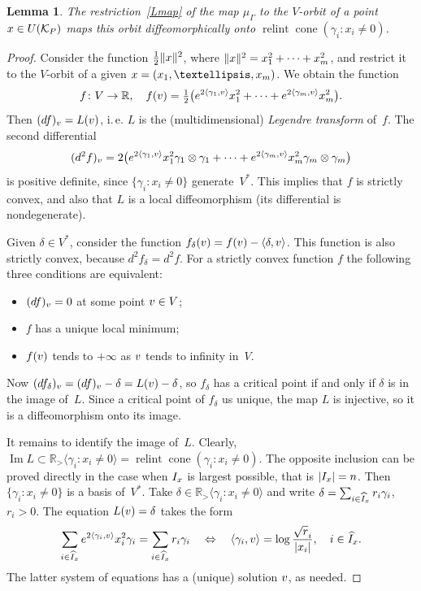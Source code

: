 \documentclass[a4paper]{amsart}
\newtheorem{lemma}[theorem]{Lemma}
\theoremstyle{definition}
\theoremstyle{remark}
\numberwithin{equation}{section}
\def\R{\mathbb R}
\def\R{\mathbb R}
\def\sK{\mathcal K}
\newcommand{\mb}[1]{{\textbf {\textit#1}}}
\def\Im{\mathop{\mathrm{Im}}}
\def\cone{\mathop{\mathrm{cone}}}
\def\relint{\mathop{\mathrm{relint}}}
\newcommand{\<}{\langle}
\renewcommand{\>}{\rangle}
\begin{document}
\begin{lemma}
\label{image}
The restriction~\eqref{Lmap} of the map $\mu_\Gamma$ to the $V$-orbit of a point $\mb x\in U(\sK_P)$ maps this orbit diffeomorphically onto $\relint\cone(\gamma_i\colon x_i\ne0)$.
\end{lemma}
\begin{proof}
Consider the function $\frac12\|\mb x\|^2$, where 
$\|\mb x\|^2=x_1^2+\cdots+x_m^2$, and restrict it to the $V$-orbit of a given $\mb x=(x_1,\ldots,x_m)$. We obtain the function
\begin{equation}\label{fsum}
  f\colon V\to\R,\quad f(\mb v)={\textstyle\frac12}\bigl(e^{2\langle\gamma_1,\mb 
  v\rangle}x_1^2+\cdots +e^{2\langle\gamma_m,\mb v\rangle}x_m^2\bigr).
\end{equation}
Then $(df)_{\mb v}=L(\mb v)$, i.\,e. $L$ is the (multidimensional) \emph{Legendre transform} of~$f$. The second differential
\[
  (d^2f)_{\mb v}=2\bigl(e^{2\langle\gamma_1,\mb v\rangle}x_1^2
  \gamma_1\otimes\gamma_1+
  \cdots +e^{2\langle\gamma_m,\mb v\rangle}   
  x_m^2\gamma_m\otimes\gamma_m\bigr)
\]
is positive definite, since $\{\gamma_i\colon x_i\ne0\}$ generate~$V^*$. This implies that $f$ is strictly convex, and also that $L$ is a local diffeomorphism (its differential is nondegenerate).

Given $\delta\in V^*$, consider the function $f_\delta(\mb v)=f(\mb v)-\langle\delta,\mb v\rangle$. This function is also strictly convex, because $d^2f_\delta=d^2f$. For a strictly convex function $f$ the following three conditions are equivalent:
\begin{itemize}
\item[(a)] $(df)_{\mb v}=0$ at some point $\mb v\in V$;
\item[(b)] $f$ has a unique local minimum;
\item[(c)] $f(\mb v)$ tends to $+\infty$ as $\mb v$ tends to infinity in~$V$.
\end{itemize}
Now $(df_\delta)_{\mb v}=(df)_{\mb v}-\delta=L(\mb v)-\delta$, so $f_\delta$ has a critical point if and only if $\delta$ is in the image of~$L$. Since a critical point of $f_\delta$ us unique, the map $L$ is injective, so it is a diffeomorphism onto its image. 

It remains to identify the image of~$L$. Clearly, $\Im L\subset\R_>\langle\gamma_i\colon x_i\ne 0\rangle=\relint\cone(\gamma_i\colon x_i\ne0)$. The opposite inclusion can be proved directly in the case when $I_{\mb x}$ is largest possible, that is $|I_{\mb x}|=n$. Then $\{\gamma_i\colon x_i\ne 0\}$ is a basis of~$V^*$. Take $\delta\in\R_>\langle\gamma_i\colon x_i\ne 0\rangle$ and write 
$\delta=\sum_{i\in\widehat I_{\mb x}}r_i\gamma_i$, $r_i>0$. The equation $L(\mb v)=\delta$ takes the form
\[
  \sum_{i\in\widehat I_{\mb x}}e^{2\langle\gamma_i,\mb v\rangle} x_i^2\gamma_i
  =\sum_{i\in\widehat I_{\mb x}}r_i\gamma_i\quad\Leftrightarrow\quad
  \langle\gamma_i,\mb v\rangle=\log\frac{\sqrt r_i}{|x_i|},\quad i\in\widehat I_{\mb x}.
\]
The latter system of equations has a (unique) solution $\mb v$, as needed.


\end{proof}
\end{document}
